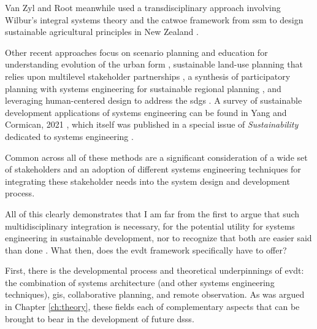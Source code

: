 Van Zyl and Root meanwhile used a transdisciplinary approach involving Wilbur's integral systems theory \cite{esbjorn-hargensOverviewIntegralTheory2010} and the \ac{catwoe} framework from \ac{ssm} \cite{checklandSoftSystemsMethodology2000} to design sustainable agricultural principles in New Zealand \cite{vanzylTransdisciplinaryDesignImplementation2020}.

Other recent approaches focus on scenario planning and education for understanding evolution of the urban form \cite{geyerSystemsEngineeringMethodology2014}, sustainable land-use planning that relies upon multilevel stakeholder partnerships \cite{puchol-salortUrbanPlanningSustainability2021}, a synthesis of participatory planning with systems engineering for sustainable regional planning \cite{aspenDevelopingParticipatoryPlanning2021}, and leveraging human-centered design to address the \acp{sdg} \cite{muellerUsingHumanCenteredDesign2020}. A survey of sustainable development applications of systems engineering can be found in Yang and Cormican, 2021 \cite{yangCrossoversConnectivitySystems2021}, which itself was published in a special issue of \textit{Sustainability} dedicated to systems engineering \cite{haskinsSystemsEngineeringSustainable2021}.

Common across all of these methods are a significant consideration of a wide set of stakeholders and an adoption of different systems engineering techniques for integrating these stakeholder needs into the system design and development process.

All of this clearly demonstrates that I am far from the first to argue that such multidisciplinary integration is necessary, for the potential utility for systems engineering in sustainable development, nor to recognize that both are easier said than done \cite{shahumyanIntegrationLandUse2017}. What then, does the \ac{evdt} framework specifically have to offer? 

First, there is the developmental process and theoretical underpinnings of \ac{evdt}: the combination of systems architecture (and other systems engineering techniques), \ac{gis}, collaborative planning, and remote observation. As was argued in Chapter \ref{ch:theory}, these fields each of complementary aspects that can be brought to bear in the development of future \acp{dss}.

